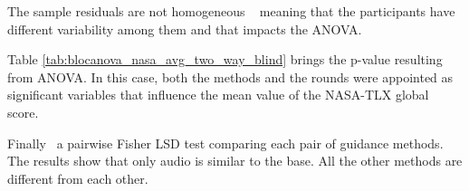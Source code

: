 The sample residuals are not homogeneous \ %
meaning that the participants have different variability among them and that impacts the ANOVA.


Table \ref{tab:blocanova_nasa_avg_two_way_blind} brings the p-value resulting from ANOVA. In this case, both the methods and the rounds were appointed as significant variables that influence the mean value of the NASA-TLX global score. 



Finally\ %
a pairwise Fisher LSD test comparing each pair of guidance methods. The results show that only audio is similar to the base. All the other methods are different from each other.

%


%

